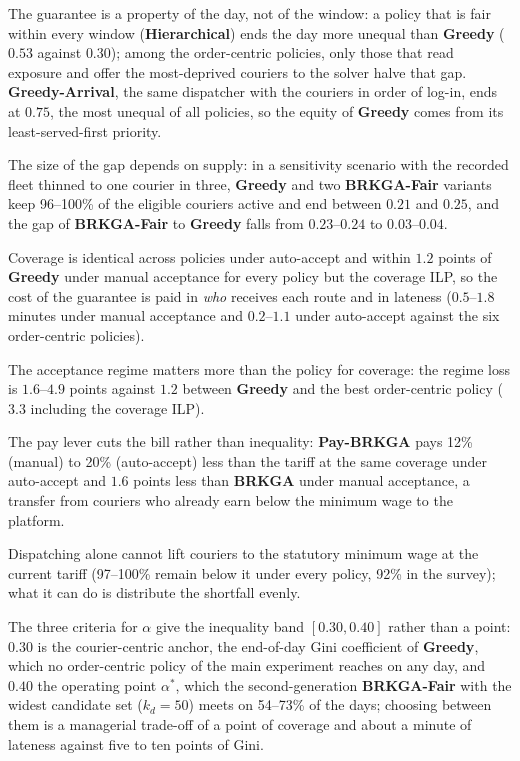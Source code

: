 \documentclass[a4paper,11pt,review,3p,authoryear]{elsarticle}
\begin{document}
\begin{compactitem}
    \item The guarantee is a property of the day, not of the window: a policy that is fair within every window (\textbf{Hierarchical}) ends the day more unequal than \textbf{Greedy} ($0.53$ against $0.30$); among the order-centric policies, only those that read exposure and offer the most-deprived couriers to the solver halve that gap. \textbf{Greedy-Arrival}, the same dispatcher with the couriers in order of log-in, ends at $0.75$, the most unequal of all policies, so the equity of \textbf{Greedy} comes from its least-served-first priority.
    \item The size of the gap depends on supply: in a sensitivity scenario with the recorded fleet thinned to one courier in three, \textbf{Greedy} and two \textbf{BRKGA-Fair} variants keep 96--100\% of the eligible couriers active and end between $0.21$ and $0.25$, and the gap of \textbf{BRKGA-Fair} to \textbf{Greedy} falls from $0.23$--$0.24$ to $0.03$--$0.04$.
    \item Coverage is identical across policies under auto-accept and within $1.2$ points of \textbf{Greedy} under manual acceptance for every policy but the coverage ILP, so the cost of the guarantee is paid in \emph{who} receives each route and in lateness ($0.5$--$1.8$ minutes under manual acceptance and $0.2$--$1.1$ under auto-accept against the six order-centric policies).
    \item The acceptance regime matters more than the policy for coverage: the regime loss is $1.6$--$4.9$ points against $1.2$ between \textbf{Greedy} and the best order-centric policy ($3.3$ including the coverage ILP).
    \item The pay lever cuts the bill rather than inequality: \textbf{Pay-BRKGA} pays 12\% (manual) to 20\% (auto-accept) less than the tariff at the same coverage under auto-accept and $1.6$ points less than \textbf{BRKGA} under manual acceptance, a transfer from couriers who already earn below the minimum wage to the platform.
    \item Dispatching alone cannot lift couriers to the statutory minimum wage at the current tariff (97--100\% remain below it under every policy, 92\% in the survey); what it can do is distribute the shortfall evenly.
    \item The three criteria for $\alpha$ give the inequality band $[0.30, 0.40]$ rather than a point: $0.30$ is the courier-centric anchor, the end-of-day Gini coefficient of \textbf{Greedy}, which no order-centric policy of the main experiment reaches on any day, and $0.40$ the operating point $\alpha^*$, which the second-generation \textbf{BRKGA-Fair} with the widest candidate set ($k_d = 50$) meets on 54--73\% of the days; choosing between them is a managerial trade-off of a point of coverage and about a minute of lateness against five to ten points of Gini.
\end{compactitem}
\end{document}
